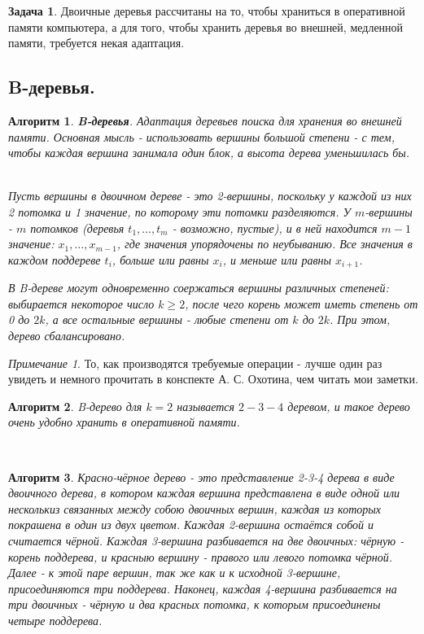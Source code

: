 \documentclass[a4paper]{article}
\theoremstyle{indented}
\newtheorem{alg}{Алгоритм}
\theoremstyle{definition}
\newtheorem{prob}{Задача}
\theoremstyle{remark}
\newtheorem{remark}{Примечание}
\begin{document}
\begin{prob}
    Двоичные деревья рассчитаны на то, чтобы храниться в оперативной памяти компьютера, а для того, чтобы хранить деревья во внешней, медленной памяти, требуется некая адаптация.
\end{prob}

\subsection{B-деревья.}

\begin{alg}
    \textbf{B-деревья}. Адаптация деревьев поиска для хранения во внешней памяти. Основная мысль - использовать вершины большой степени - с тем, чтобы каждая вершина занимала один блок, а высота дерева уменьшилась бы. \ 

    Пусть вершины в двоичном дереве - это 2-вершины, поскольку у каждой из них 2 потомка и 1 значение, по которому эти потомки разделяются. У $m$-вершины - $m$ потомков (деревья $t_1, \ldots, t_m$ - возможно, пустые), и в ней находится $m-1$ значение: $x_1, \ldots, x_{m-1}$, где значения упорядочены по неубыванию. Все значения в каждом поддереве $t_i$, больше или равны $x_i$, и меньше или равны $x_{i+1}$. \ 

    В B-дереве могут одновременно соержаться вершины различных степеней: выбирается некоторое число $k\geq 2$, после чего корень может иметь степень от 0 до $2k$, а все остальные вершины - любые степени от $k$ до $2k$. При этом, дерево сбалансировано.
\end{alg}

\begin{remark}
    То, как производятся требуемые операции - лучше один раз увидеть и немного прочитать в конспекте А. С. Охотина, чем читать мои заметки.
\end{remark}

\begin{alg}
    B-дерево для $k=2$ называется $2-3-4$ деревом, и такое дерево очень удобно хранить в оперативной памяти. 
\end{alg} \ 

\begin{alg}
    Красно-чёрное дерево - это представление 2-3-4 дерева в виде двоичного дерева, в котором каждая вершина представлена в виде одной или несколькиз связанных между собою двоичных вершин, каждая из которых покрашена в один из двух цветом. Каждая 2-вершина остаётся собой и считается чёрной. Каждая 3-вершина разбивается на две двоичных: чёрную - корень поддерева, и красныю вершину - правого или левого потомка чёрной. Далее - к этой паре вершин, так же как и к исходной 3-вершине, присоединяются три поддерева. Наконец, каждая 4-вершина разбивается на три двоичных - чёрную и два красных потомка, к которым присоединены четыре поддерева.
\end{alg}
\end{document}
